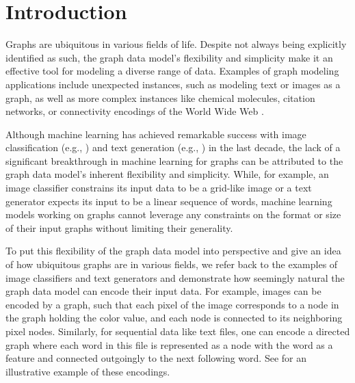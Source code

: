 \section{Introduction}
Graphs are ubiquitous in various fields of life. Despite not always being explicitly identified as such, the graph data model's flexibility and simplicity make it an effective tool for modeling a diverse range of data. Examples of graph modeling applications include unexpected instances, such as modeling text or images as a graph, as well as more complex instances like chemical molecules, citation networks, or connectivity encodings of the World Wide Web \cite{Mor+2020, Sca+2009}.

Although machine learning has achieved remarkable success with image classification (e.g., \cite{Zoph2018, He2016}) and text generation (e.g., \cite{Radford2019, Brown2020}) in the last decade, the lack of a significant breakthrough in machine learning for graphs can be attributed to the graph data model's inherent flexibility and simplicity. While, for example, an image classifier constrains its input data to be a grid-like image or a text generator expects its input to be a linear sequence of words, machine learning models working on graphs cannot leverage any constraints on the format or size of their input graphs without limiting their generality. 

To put this flexibility of the graph data model into perspective and give an idea of how ubiquitous graphs are in various fields, we refer back to the examples of image classifiers and text generators and demonstrate how seemingly natural the graph data model can encode their input data. For example, images can be encoded by a graph, such that each pixel of the image corresponds to a node in the graph holding the color value, and each node is connected to its neighboring pixel nodes. Similarly, for sequential data like text files, one can encode a directed graph where each word in this file is represented as a node with the word as a feature and connected outgoingly to the next following word. See  for an illustrative example of these encodings.

